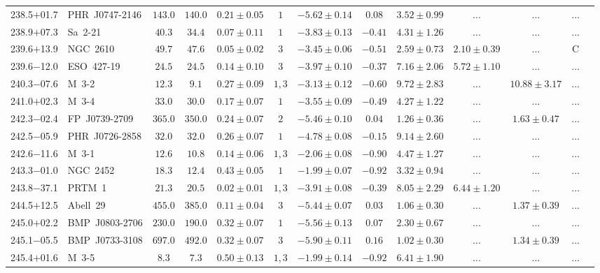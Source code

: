 \documentclass[useAMS]{mn2e}
\begin{document}
\begin{center}
{\begin{longtable}{llccccccccccc}
238.5$+$01.7&PHR~J0747-2146&$     143.0$&$     140.0$&$      0.21\pm0.05$&$1$&$-5.62 \pm 0.14$&$      0.08$&$3.52 \pm 0.99$&$...$&$...$&...\\
238.9$+$07.3&Sa~2-21&$      40.3$&$      34.4$&$0.07 \pm 0.11$&$1$&$-3.83 \pm 0.13$&$     -0.41$&$4.31 \pm 1.26$&$...$&$...$&...\\
239.6$+$13.9&NGC~2610&$      49.7$&$      47.6$&$0.05 \pm 0.02$&$3$&$-3.45 \pm 0.06$&$     -0.51$&$2.59 \pm 0.73$&$2.10 \pm 0.39$&$...$&C\\
239.6$-$12.0&ESO~427-19&$      24.5$&$      24.5$&$0.14 \pm 0.10$&$3$&$-3.97 \pm 0.10$&$     -0.37$&$7.16 \pm 2.06$&$5.72 \pm 1.10$&$...$&...\\
240.3$-$07.6&M~3-2&$      12.3$&$       9.1$&$0.27 \pm 0.09$&$1,3$&$-3.13 \pm 0.12$&$     -0.60$&$9.72 \pm 2.83$&$...$&$10.88 \pm 3.17$&...\\
241.0$+$02.3&M~3-4&$      33.0$&$      30.0$&$0.17 \pm 0.07$&$1$&$-3.55 \pm 0.09$&$     -0.49$&$4.27 \pm 1.22$&$...$&$...$&...\\
242.3$-$02.4&FP~J0739-2709&$     365.0$&$     350.0$&$0.24 \pm 0.07$&$2$&$-5.46 \pm 0.10$&$      0.04$&$1.26 \pm 0.36$&$...$&$1.63 \pm 0.47$&...\\
242.5$-$05.9&PHR~J0726-2858&$      32.0$&$      32.0$&$0.26 \pm 0.07$&$1$&$-4.78 \pm 0.08$&$     -0.15$&$9.14 \pm 2.60$&$...$&$...$&...\\
242.6$-$11.6&M~3-1&$      12.6$&$      10.8$&$0.14 \pm 0.06$&$1,3$&$-2.06 \pm 0.08$&$     -0.90$&$4.47 \pm 1.27$&$...$&$...$&...\\
243.3$-$01.0&NGC~2452&$      18.3$&$      12.4$&$0.43 \pm 0.05$&$1$&$-1.99 \pm 0.07$&$     -0.92$&$3.32 \pm 0.94$&$...$&$...$&...\\
243.8$-$37.1&PRTM~1&$      21.3$&$      20.5$&$0.02 \pm 0.01$&$1,3$&$-3.91 \pm 0.08$&$     -0.39$&$8.05 \pm 2.29$&$6.44 \pm 1.20$&$...$&...\\
244.5$+$12.5&Abell~29&$     455.0$&$     385.0$&$0.11 \pm 0.04$&$3$&$-5.44 \pm 0.07$&$      0.03$&$1.06 \pm 0.30$&$...$&$1.37 \pm 0.39$&...\\
245.0$+$02.2&BMP~J0803-2706&$     230.0$&$     190.0$&$0.32 \pm 0.07$&$1$&$-5.56 \pm 0.13$&$      0.07$&$2.30 \pm 0.67$&$...$&$...$&...\\
245.1$-$05.5&BMP~J0733-3108&$     697.0$&$     492.0$&$0.32 \pm 0.07$&$3$&$-5.90 \pm 0.11$&$      0.16$&$1.02 \pm 0.30$&$...$&$1.34 \pm 0.39$&...\\
245.4$+$01.6&M~3-5&$       8.3$&$       7.3$&$0.50 \pm 0.13$&$1,3$&$-1.99 \pm 0.14$&$     -0.92$&$6.41 \pm 1.90$&$...$&$...$&...\\

\end{longtable}}
\end{center}
\end{document}
